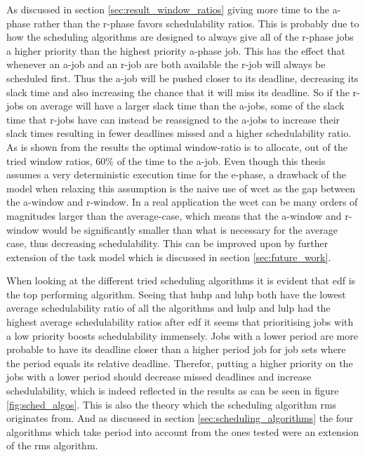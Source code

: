 \documentclass{kththesis}
\begin{document}
As discussed in section \ref{sec:result_window_ratios} giving more time to the \acrshort{a}-phase
rather than the \acrshort{r}-phase favors schedulability ratios. This is probably due to how the
scheduling algorithms are designed to always give all of the \acrshort{r}-phase jobs a higher
priority than the highest priority \acrshort{a}-phase job. This has the effect that whenever an
\acrshort{a}-job and an \acrshort{r}-job are both available the \acrshort{r}-job will always be
scheduled first. Thus the \acrshort{a}-job will be pushed closer to its deadline, decreasing its
slack time and also increasing the chance that it will miss its deadline. So if the
\acrshort{r}-jobs on average will have a larger slack time than the \acrshort{a}-jobs, some of the
slack time that \acrshort{r}-jobs have can instead be reassigned to the \acrshort{a}-jobs to
increase their slack times resulting in fewer deadlines missed and a higher schedulability ratio. As
is shown from the results the optimal window-ratio is to allocate, out of the tried window ratios,
60\% of the time to the \acrshort{a}-job. Even though this thesis assumes a very deterministic
execution time for the \acrshort{e}-phase, a drawback of the model when relaxing this assumption is
the naive use of \acrshort{wcet} as the gap between the \acrshort{a}-window and \acrshort{r}-window.
In a real application the \acrshort{wcet} can be many orders of magnitudes larger than the
average-case, which means that the \acrshort{a}-window and \acrshort{r}-window would be
significantly smaller than what is necessary for the average case, thus decreasing schedulability.
This can be improved upon by further extension of the task model which is discussed in section
\ref{sec:future_work}.



When looking at the different tried scheduling algorithms it is evident that \acrshort{edf} is the
top performing algorithm. Seeing that \acrshort{huhp} and \acrshort{luhp} both have the lowest
average schedulability ratio of all the algorithms and \acrshort{hulp} and \acrshort{lulp} had the
highest average schedulability ratios after \acrshort{edf} it seems that prioritising jobs with a
low priority boosts schedulability immensely. Jobs with a lower period are more probable to have its
deadline closer than a higher period job for job sets where the period equals its relative deadline.
Therefor, putting a higher priority on the jobs with a lower period should decrease missed deadlines
and increase schedulability, which is indeed reflected in the results as can be seen in figure
\ref{fig:sched_algos}. This is also the theory which the scheduling algorithm \acrshort{rms}
originates from. And as discussed in section \ref{sec:scheduling_algorithms} the four algorithms
which take period into account from the ones tested were an extension of the \acrshort{rms}
algorithm. 
\end{document}
